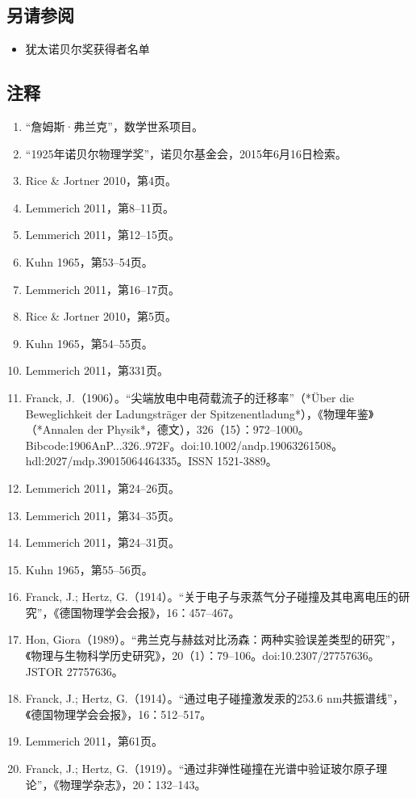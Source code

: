 \subsection{另请参阅}
\begin{itemize}
\item 犹太诺贝尔奖获得者名单
\end{itemize}
\subsection{注释}
\begin{enumerate}
\item “詹姆斯·弗兰克”，数学世系项目。
\item “1925年诺贝尔物理学奖”，诺贝尔基金会，2015年6月16日检索。
\item Rice & Jortner 2010，第4页。
\item Lemmerich 2011，第8–11页。
\item Lemmerich 2011，第12–15页。
\item Kuhn 1965，第53–54页。
\item Lemmerich 2011，第16–17页。
\item Rice & Jortner 2010，第5页。
\item Kuhn 1965，第54–55页。
\item Lemmerich 2011，第331页。
\item Franck, J.（1906）。“尖端放电中电荷载流子的迁移率”（*Über die Beweglichkeit der Ladungsträger der Spitzenentladung*），《物理年鉴》（*Annalen der Physik*，德文），326（15）：972–1000。Bibcode:1906AnP...326..972F。doi:10.1002/andp.19063261508。hdl:2027/mdp.39015064464335。ISSN 1521-3889。
\item Lemmerich 2011，第24–26页。
\item Lemmerich 2011，第34–35页。
\item Lemmerich 2011，第24–31页。
\item Kuhn 1965，第55–56页。
\item Franck, J.; Hertz, G.（1914）。“关于电子与汞蒸气分子碰撞及其电离电压的研究”，《德国物理学会会报》，16：457–467。
\item Hon, Giora（1989）。“弗兰克与赫兹对比汤森：两种实验误差类型的研究”，《物理与生物科学历史研究》，20（1）：79–106。doi:10.2307/27757636。JSTOR 27757636。
\item Franck, J.; Hertz, G.（1914）。“通过电子碰撞激发汞的253.6 nm共振谱线”，《德国物理学会会报》，16：512–517。
\item Lemmerich 2011，第61页。
\item Franck, J.; Hertz, G.（1919）。“通过非弹性碰撞在光谱中验证玻尔原子理论”，《物理学杂志》，20：132–143。

\end{enumerate}
